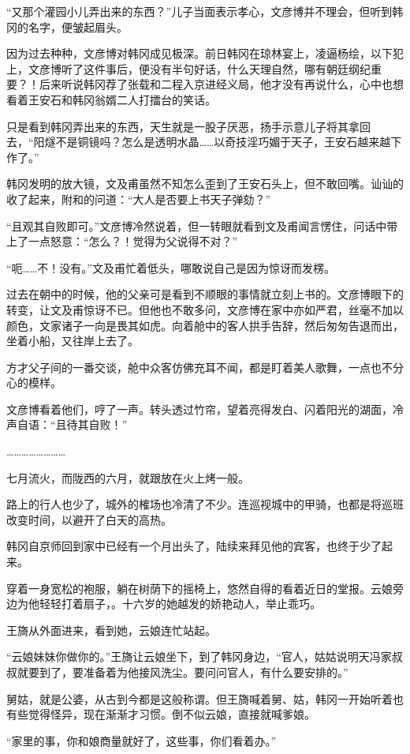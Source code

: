 “又那个灌园小儿弄出来的东西？”儿子当面表示孝心，文彦博并不理会，但听到韩冈的名字，便皱起眉头。

因为过去种种，文彦博对韩冈成见极深。前日韩冈在琼林宴上，凌逼杨绘，以下犯上，文彦博听了这件事后，便没有半句好话，什么天理自然，哪有朝廷纲纪重要？！后来听说韩冈荐了张载和二程入京进经义局，他才没有再说什么，心中也想看着王安石和韩冈翁婿二人打擂台的笑话。

只是看到韩冈弄出来的东西，天生就是一股子厌恶，扬手示意儿子将其拿回去，“阳燧不是铜镜吗？怎么是透明水晶……以奇技淫巧媚于天子，王安石越来越下作了。”

韩冈发明的放大镜，文及甫虽然不知怎么歪到了王安石头上，但不敢回嘴。讪讪的收了起来，附和的问道：“大人是否要上书天子弹劾？”

“且观其自败即可。”文彦博冷然说着，但一转眼就看到文及甫闻言愣住，问话中带上了一点怒意：“怎么？！觉得为父说得不对？”

“呃……不！没有。”文及甫忙着低头，哪敢说自己是因为惊讶而发楞。

过去在朝中的时候，他的父亲可是看到不顺眼的事情就立刻上书的。文彦博眼下的转变，让文及甫惊讶不已。但他也不敢多问，文彦博在家中亦如严君，丝毫不加以颜色，文家诸子一向是畏其如虎。向着舱中的客人拱手告辞，然后匆匆告退而出，坐着小船，又往岸上去了。

方才父子间的一番交谈，舱中众客仿佛充耳不闻，都是盯着美人歌舞，一点也不分心的模样。

文彦博看着他们，哼了一声。转头透过竹帘，望着亮得发白、闪着阳光的湖面，冷声自语：“且待其自败！”

……………………

七月流火，而陇西的六月，就跟放在火上烤一般。

路上的行人也少了，城外的榷场也冷清了不少。连巡视城中的甲骑，也都是将巡班改变时间，以避开了白天的高热。

韩冈自京师回到家中已经有一个月出头了，陆续来拜见他的宾客，也终于少了起来。

穿着一身宽松的袍服，躺在树荫下的摇椅上，悠然自得的看着近日的堂报。云娘旁边为他轻轻打着扇子，。十六岁的她越发的娇艳动人，举止乖巧。

王旖从外面进来，看到她，云娘连忙站起。

“云娘妹妹你做你的。”王旖让云娘坐下，到了韩冈身边，“官人，姑姑说明天冯家叔叔就要到了，要准备着为他接风洗尘。要问问官人，有什么要安排的。”

舅姑，就是公婆，从古到今都是这般称谓。但王旖喊着舅、姑，韩冈一开始听着也有些觉得怪异，现在渐渐才习惯。倒不似云娘，直接就喊爹娘。

“家里的事，你和娘商量就好了，这些事，你们看着办。”

